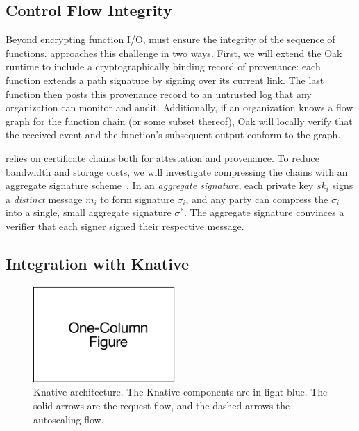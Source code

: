 


\subsection{Control Flow Integrity}
%
Beyond encrypting function I/O, \SystemName must ensure the integrity
of the sequence of functions.
%
\SystemName approaches this challenge in two ways.
%
First, we will extend the Oak runtime to include a cryptographically binding record
of provenance: each function extends a path signature by signing over its
current link.
%
The last function then posts this provenance record to an untrusted log that
any organization can monitor and audit.
%
Additionally, if an organization knows a flow graph for the function chain (or
some subset thereof),  Oak will locally verify that the received event and the
function's subsequent output conform to the graph.


\SystemName relies on certificate chains both for attestation and provenance.
%
To reduce bandwidth and storage costs, we will investigate compressing the chains
with an aggregate signature
scheme~\cite{03-eurocrypt-aggregate_signatures_bilinear_maps}.
%
In an \emph{aggregate signature}, each private key $sk_i$ signs a
\emph{distinct} message $m_i$ to form signature $\sigma_i$, and any party can
compress the $\sigma_i$ into a single, small aggregate signature $\sigma^*$.  
%
The aggregate signature convinces a verifier that each signer signed their
respective message.



\subsection{Integration with Knative}

\begin{figure}
    \centering
    \includegraphics[page = 6, width=0.48\textwidth]{diagrams/slides.pdf}
    \caption{Knative architecture.
    The Knative components are in light blue.
    The solid arrows are the request flow, and the dashed arrows the
    autoscaling flow.}
    \label{fig:knative}
\end{figure}

